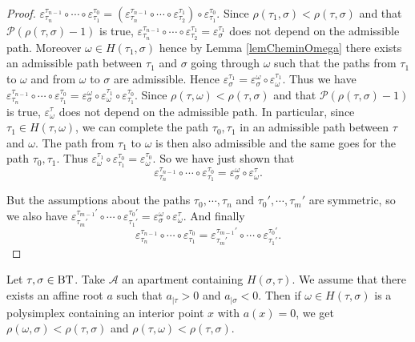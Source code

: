 \documentclass[a4paper,10pt]{amsart}
\begin{document}
\begin{proof}
$\varepsilon^{\tau_{n-1}}_{\tau_{n}} \circ \cdots \circ \varepsilon_{\tau_{1}}^{\tau_{0}}=(\varepsilon^{\tau_{n-1}}_{\tau_{n}} \circ \cdots \circ \varepsilon_{\tau_{2}}^{\tau_{1}})\circ \varepsilon_{\tau_{1}}^{\tau_{0}}$. Since $\rho(\tau_{1},\sigma)<\rho(\tau,\sigma)$ and that $\mathcal{P}(\rho(\tau,\sigma)-1)$ is true, $\varepsilon^{\tau_{n-1}}_{\tau_{n}} \circ \cdots \circ \varepsilon_{\tau_{2}}^{\tau_{1}}=\varepsilon^{\tau_{1}}_{\sigma}$ does not depend on the admissible path. Moreover $\omega \in H(\tau_{1},\sigma)$ hence by Lemma \ref{lemCheminOmega} there exists an admissible path between $\tau_{1}$ and $\sigma$ going through $\omega$ such that the paths from $\tau_{1}$ to $\omega$ and from $\omega$ to $\sigma$ are admissible. Hence $\varepsilon^{\tau_{1}}_{\sigma}=\varepsilon^{\omega}_{\sigma} \circ \varepsilon^{\tau_{1}}_{\omega}$. Thus we have $\varepsilon^{\tau_{n-1}}_{\tau_{n}} \circ \cdots \circ \varepsilon_{\tau_{1}}^{\tau_{0}}=\varepsilon^{\omega}_{\sigma} \circ \varepsilon^{\tau_{1}}_{\omega} \circ \varepsilon_{\tau_{1}}^{\tau_{0}}$. Since $\rho(\tau,\omega)<\rho(\tau,\sigma)$ and that $\mathcal{P}(\rho(\tau,\sigma)-1)$ is true, $\varepsilon^{\tau}_{\omega}$ does not depend on the admissible path. In particular, since $\tau_{1} \in H(\tau,\omega)$, we can complete the path $\tau_{0},\tau_{1}$ in an admissible path between $\tau$ and $\omega$. The path from $\tau_{1}$ to $\omega$ is then also admissible and the same goes for the path $\tau_{0},\tau_{1}$. Thus $\varepsilon^{\tau_{1}}_{\omega} \circ \varepsilon_{\tau_{1}}^{\tau_{0}}=\varepsilon_{\omega}^{\tau_{0}}$. So we have just shown that
\[\varepsilon^{\tau_{n-1}}_{\tau_{n}} \circ \cdots \circ \varepsilon_{\tau_{1}}^{\tau_{0}}=\varepsilon_{\sigma}^{\omega} \circ \varepsilon_{\omega}^{\tau}.\]

But the assumptions about the paths $\tau_{0},\cdots,\tau_{n}$ and $\tau_{0}',\cdots,\tau_{m}'$ are symmetric, so we also have $\varepsilon^{\tau_{m-1}'}_{\tau_{m}'} \circ \cdots \circ \varepsilon_{\tau_{1}'}^{\tau_{0}'}=\varepsilon_{\sigma}^{\omega} \circ \varepsilon_{\omega}^{\tau}$. And finally
\[\varepsilon^{\tau_{n-1}}_{\tau_{n}} \circ \cdots \circ \varepsilon_{\tau_{1}}^{\tau_{0}}=\varepsilon^{\tau_{m-1}'}_{\tau_{m}'} \circ \cdots \circ \varepsilon_{\tau_{1}'}^{\tau_{0}'}.\]
\end{proof}

\begin{Lem}
\label{lemseparationsimplexe}
Let $\tau,\sigma \in \bt$. Take $\mathcal{A}$ an apartment containing $H(\sigma,\tau)$. We assume that there exists an affine root $a$ such that $a_{|\tau}>0$ and $a_{|\sigma}<0$. Then if $\omega \in H(\tau,\sigma)$ is a polysimplex containing an interior point $x$ with $a(x)=0$, we get $\rho(\omega,\sigma) < \rho(\tau,\sigma)$ and $\rho(\tau,\omega)<\rho(\tau,\sigma)$.
\end{Lem}
\end{document}
